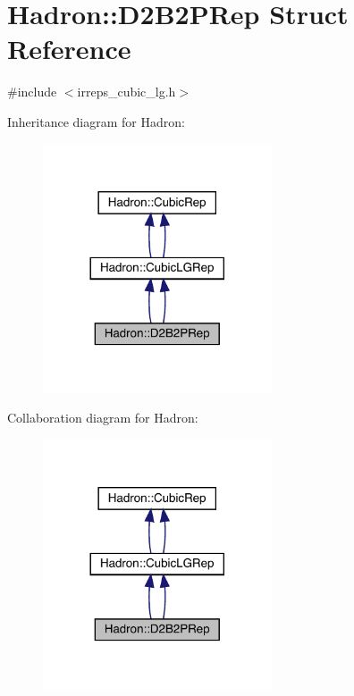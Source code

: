 \hypertarget{structHadron_1_1D2B2PRep}{}\section{Hadron\+:\+:D2\+B2\+P\+Rep Struct Reference}
\label{structHadron_1_1D2B2PRep}


{\ttfamily \#include $<$irreps\+\_\+cubic\+\_\+lg.\+h$>$}



Inheritance diagram for Hadron\+:\nopagebreak
\begin{figure}[H]
\begin{center}
\leavevmode
\includegraphics[width=192pt]{d3/d05/structHadron_1_1D2B2PRep__inherit__graph}
\end{center}
\end{figure}


Collaboration diagram for Hadron\+:\nopagebreak
\begin{figure}[H]
\begin{center}
\leavevmode
\includegraphics[width=192pt]{da/dd2/structHadron_1_1D2B2PRep__coll__graph}
\end{center}
\end{figure}

